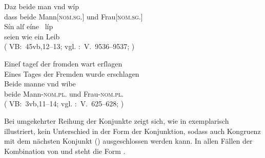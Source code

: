 \begin{exe}
\ex \label{ex:konjmixbeide1}
	\begin{xlist}
	\ex \gll Daz beide man vnd wíp \\
			dass beide Mann[\textsc{nom.sg.\MascM}] und Frau[\textsc{nom.sg.\NeutF}] \\
	\sn \gll Sín alſ eíne~ líp \\
			seien wie ein Leib \\
		\trans {}
			(%
				VB:~45vb,12--13; vgl.
				\KC:~V.~9536--9537;
				\cite[257]{schroeder1895}%
			)
		\label{ex:konjmixbeide1_1}

	\ex \label{ex:konjmixbeide1_2}
		\gll Eineſ tageſ der fromden wart erſlagen \\
			Eines Tages der Fremden wurde erschlagen \\
		\textelp{}
	\sn \gll Beide manne vnd wibe \\
			beide Mann-\textsc{nom.pl.\MascM} und Frau-\textsc{nom.pl.\NeutF} \\
		\trans {}
			(%
				VB:~3vb,11--14; vgl.
				\KC:~V.~625--628;
				\cite[93]{schroeder1895}%
			)
	\end{xlist}
\end{exe}

Bei umgekehrter Reihung der Konjunkte zeigt sich, wie in 
exemplarisch illustriert, kein Unterschied in der Form der Konjunktion, sodass
auch Kongruenz mit dem nächsten Konjunkt
() ausgeschlossen werden kann. In allen Fällen der
Kombination von   und   steht die Form .

